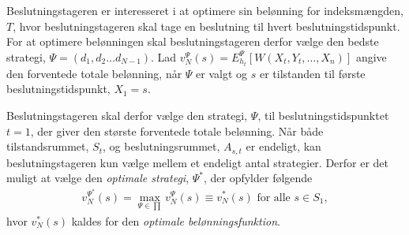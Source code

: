 


Beslutningstageren er interesseret i at optimere sin belønning for indeksmængden, $T$, hvor beslutningstageren skal tage en beslutning til hvert beslutningstidspunkt. For at optimere belønningen skal beslutningstageren derfor vælge den bedste strategi, $\Psi=(d_1, d_2\dots d_{N-1})$.
Lad $v_N^{\Psi}(s)= E_{h_t}^\Psi \left[W(X_t , Y_t , \dots , X_n) \right]$ angive den forventede totale belønning, når $\Psi$ er valgt og $s$ er tilstanden til første beslutningstidspunkt, $X_1=s$. 

Beslutningstageren skal derfor vælge den strategi, $\Psi$, til beslutningstidspunktet $t=1$, der giver den største forventede totale belønning. Når både tilstandsrummet, $S_t$, og beslutningsrummet, $A_{s,t}$ er endeligt, kan beslutningstageren kun vælge mellem et endeligt antal strategier. Derfor er det muligt at vælge den \textit{optimale strategi}, $\Psi^*$, der opfylder følgende
\begin{align}\label{eq:optimale_belønningsfunktion}
    v_N^{\Psi^*}(s)=\max_{\Psi\in \prod} v_N^{\Psi}(s)\equiv v_N^*(s) \text{ for alle }  s\in S_1,
\end{align}
hvor $v_N^*(s)$ kaldes for den \textit{optimale belønningsfunktion}.






